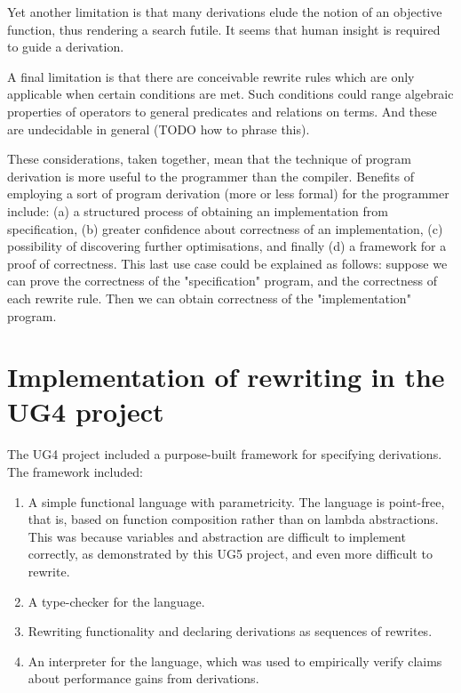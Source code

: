 \documentclass[bsc,frontabs,twoside,singlespacing,parskip,deptreport]{infthesis}
\theoremstyle{definition}
\begin{document}
Yet another limitation is that many derivations elude the notion of an
objective function, thus rendering a search futile. It seems that
human insight is required to guide a derivation.

A final limitation is that there are conceivable rewrite rules which
are only applicable when certain conditions are met. Such conditions
could range algebraic properties of operators to general predicates
and relations on terms. And these are undecidable in general (TODO how
to phrase this).

These considerations, taken together, mean that the technique of
program derivation is more useful to the programmer than the
compiler. Benefits of employing a sort of program derivation (more or
less formal) for the programmer include: (a) a structured process of
obtaining an implementation from specification, (b) greater confidence
about correctness of an implementation, (c) possibility of discovering
further optimisations, and finally (d) a framework for a proof of
correctness. This last use case could be explained as follows: suppose
we can prove the correctness of the "specification" program, and the
correctness of each rewrite rule. Then we can obtain correctness of
the "implementation" program.

\section{Implementation of rewriting in the UG4 project}
\label{sec:impl-rewr-ug4}

The UG4 project included a purpose-built framework for specifying
derivations. The framework included:

\begin{enumerate}
\item A simple functional language with parametricity. The language is
point-free, that is, based on function composition rather than on
lambda abstractions. This was because variables and abstraction are
difficult to implement correctly, as demonstrated by this UG5 project,
and even more difficult to rewrite.

\item A type-checker for the language.

\item Rewriting functionality and declaring derivations as sequences of
  rewrites.

\item An interpreter for the language, which was used to empirically
  verify claims about performance gains from derivations.
\end{enumerate}
\end{document}
